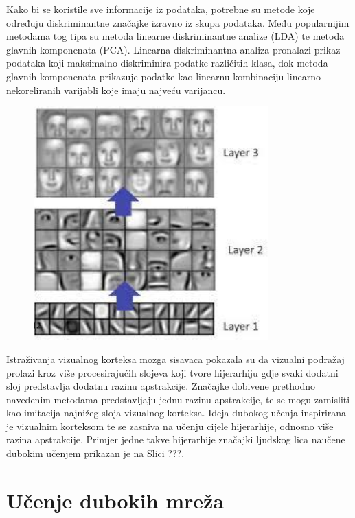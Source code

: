 \documentclass[lmodern, utf8, diplomski, numeric]{fer}
\begin{document}
Kako bi se koristile sve informacije iz podataka, potrebne su metode koje određuju diskriminantne značajke izravno iz skupa podataka. Među popularnijim metodama tog tipa su metoda linearne diskriminantne analize (LDA) te metoda glavnih komponenata (PCA). Linearna diskriminantna analiza pronalazi prikaz podataka koji maksimalno diskriminira podatke različitih klasa, dok metoda glavnih komponenata prikazuje podatke kao linearnu kombinaciju linearno nekoreliranih varijabli koje imaju najveću varijancu.

\begin{figure}[ht!]
\centering
\includegraphics[height=9cm]{slike/feature_hierarchy2.jpeg}
\caption{}
\end{figure}

Istraživanja vizualnog korteksa mozga sisavaca pokazala su da vizualni podražaj prolazi kroz više procesirajućih slojeva koji tvore hijerarhiju gdje svaki dodatni sloj predstavlja dodatnu razinu apstrakcije.  Značajke dobivene prethodno navedenim metodama predstavljaju jednu razinu apstrakcije, te se mogu zamisliti kao imitacija najnižeg sloja vizualnog korteksa. Ideja dubokog učenja inspirirana je vizualnim korteksom te se zasniva na učenju cijele hijerarhije, odnosno više razina apstrakcije. Primjer jedne takve hijerarhije značajki ljudskog lica naučene dubokim učenjem prikazan je na Slici ???.


\section{Učenje dubokih mreža}
\end{document}
